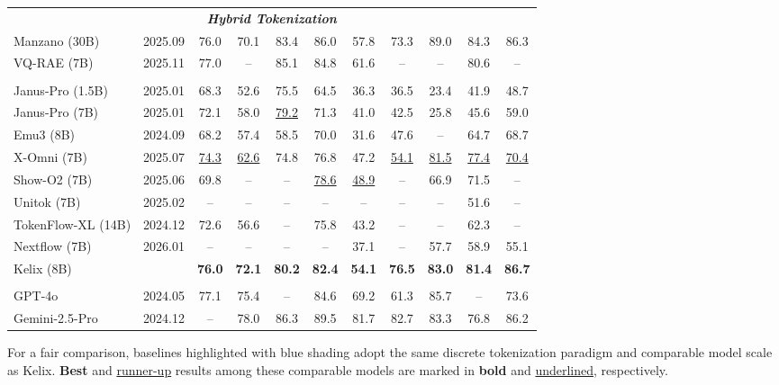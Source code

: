 \documentclass[11pt, a4paper, logo, copyright]{googledeepmind}
\begin{document}
\begin{table}[t]
{\begin{tabular}{l c  ccc  ccc  ccc}
    \multicolumn{11}{c}{\textbf{\textit{Hybrid Tokenization}}} \\
    Manzano (30B)         & 2025.09   & 76.0 & 70.1 & 83.4 & 86.0 & 57.8 & 73.3 & 89.0 & 84.3 & 86.3 \\
    VQ-RAE (7B)  & 2025.11   & 77.0 & -- & 85.1 & 84.8 & 61.6 & -- & -- & 80.6 & -- \\
    \rowcolor{blue!10}
    \multicolumn{11}{c}{\textbf{\textit{Discrete Tokenization}}} \\
    \rowcolor{blue!10}
    Janus-Pro (1.5B)      & 2025.01   & 68.3 & 52.6 & 75.5 & 64.5 & 36.3 & 36.5 & 23.4 & 41.9 & 48.7 \\
    \rowcolor{blue!10}
    Janus-Pro (7B)        & 2025.01   & 72.1 & 58.0 & \underline{79.2} & 71.3 & 41.0 & 42.5 & 25.8 & 45.6 & 59.0 \\
    \rowcolor{blue!10}
    Emu3 (8B)             & 2024.09   & 68.2 & 57.4 & 58.5 & 70.0 & 31.6 & 47.6 & --   & 64.7 & 68.7 \\
    \rowcolor{blue!10}
    X-Omni (7B)           & 2025.07   & \underline{74.3} & \underline{62.6} & 74.8 & 76.8 & 47.2 & \underline{54.1} & \underline{81.5} & \underline{77.4} & \underline{70.4} \\
    \rowcolor{blue!10}
    Show-O2 (7B)          & 2025.06   & 69.8   & --   & --   & \underline{78.6}   & \underline{48.9}   & --   & 66.9   & 71.5   & --   \\
    \rowcolor{blue!10}
    Unitok (7B)           & 2025.02   & --   & --   & --   & --   & --   & --   & --   & 51.6   & --   \\
    \rowcolor{blue!10}
    TokenFlow-XL (14B)       & 2024.12   & 72.6   & 56.6   & --   & 75.8   & 43.2   & --   & --   & 62.3   & --   \\
    \rowcolor{blue!10}
    Nextflow (7B)         & 2026.01   & --   & --   & --   & --   & 37.1   & --   & 57.7   & 58.9   & 55.1   \\
    \rowcolor{blue!10}
    Kelix (8B)          &           & \textbf{76.0} & \textbf{72.1} & \textbf{80.2} & \textbf{82.4} & \textbf{54.1} & \textbf{76.5} & \textbf{83.0} & \textbf{81.4} & \textbf{86.7} \\
    \midrule
    
    \rowcolor{gray!10}
    \multicolumn{11}{l}{\textbf{Proprietary Models}} \\
    GPT-4o                & 2024.05   & 77.1 & 75.4 & --   & 84.6 & 69.2 & 61.3 & 85.7 & --   & 73.6 \\
    Gemini-2.5-Pro        & 2024.12   & --   & 78.0 & 86.3 & 89.5 & 81.7 & 82.7 & 83.3 & 76.8 & 86.2 \\
    
    \bottomrule
    \end{tabular}
    }
\label{tab:full_comprehensive_evaluation_clean}
For a fair comparison, baselines highlighted with \colorbox{blue!10}{blue shading} adopt the same discrete tokenization paradigm and comparable model scale as Kelix. \textbf{Best} and \underline{runner-up} results among these comparable models are marked in \textbf{bold} and \underline{underlined}, respectively.
\end{table}
\end{document}
